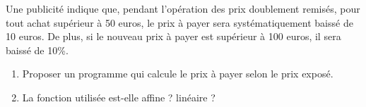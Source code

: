 
Une publicité indique que, pendant l'opération des prix doublement remisés, pour tout achat supérieur à 50 euros, le prix à payer sera systématiquement baissé de 10 euros. De plus, si le nouveau prix à payer est supérieur à 100 euros, il sera baissé de 10\%.
\begin{enumerate}
\item Proposer un programme qui calcule le prix à payer selon le prix exposé.
\item La fonction utilisée est-elle affine ? linéaire ? 
\end{enumerate}